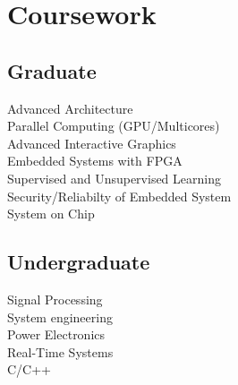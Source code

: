 \documentclass[]{deedy-resume-openfont}
\begin{document}
\begin{minipage}[t]{0.30\textwidth}
\section{Coursework}
\subsection{Graduate}
Advanced Architecture \\
Parallel Computing (GPU/Multicores) \\
Advanced Interactive Graphics \\
Embedded Systems with FPGA \\
Supervised and Unsupervised Learning \\
Security/Reliabilty of Embedded System \\
System on Chip \\
\sectionsep

\subsection{Undergraduate}
Signal Processing \\
System engineering \\
Power Electronics \\
Real-Time Systems \\
C/C++  \\

%
%

\end{minipage} 
\hfill
\end{document}
